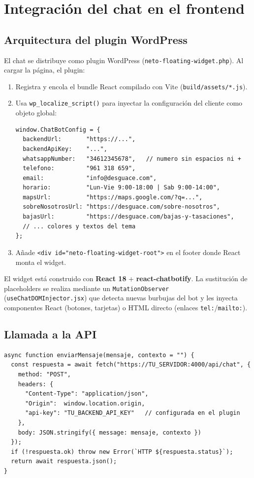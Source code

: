 \documentclass[12pt, a4paper]{article}
\begin{document}
\section{Integración del chat en el frontend}

\subsection{Arquitectura del plugin WordPress}

El chat se distribuye como plugin WordPress (\texttt{neto-floating-widget.php}).
Al cargar la página, el plugin:

\begin{enumerate}[noitemsep]
  \item Registra y encola el bundle React compilado con Vite (\texttt{build/assets/*.js}).
  \item Usa \texttt{wp\_localize\_script()} para inyectar la configuración del cliente como objeto global:
\begin{lstlisting}[style=js]
window.ChatBotConfig = {
  backendUrl:       "https://...",
  backendApiKey:    "...",
  whatsappNumber:   "34612345678",   // numero sin espacios ni +
  telefono:         "961 318 659",
  email:            "info@desguace.com",
  horario:          "Lun-Vie 9:00-18:00 | Sab 9:00-14:00",
  mapsUrl:          "https://maps.google.com/?q=...",
  sobreNosotrosUrl: "https://desguace.com/sobre-nosotros",
  bajasUrl:         "https://desguace.com/bajas-y-tasaciones",
  // ... colores y textos del tema
};
\end{lstlisting}
  \item Añade \texttt{<div id="neto-floating-widget-root">} en el footer donde React monta el widget.
\end{enumerate}

El widget está construido con \textbf{React 18} + \textbf{react-chatbotify}. La sustitución de placeholders se realiza mediante un \texttt{MutationObserver} (\texttt{useChatDOMInjector.jsx}) que detecta nuevas burbujas del bot y les inyecta componentes React (botones, tarjetas) o HTML directo (enlaces \texttt{tel:}/\texttt{mailto:}).

\subsection{Llamada a la API}

\begin{lstlisting}[style=js, caption={Función básica de llamada al backend}]
async function enviarMensaje(mensaje, contexto = "") {
  const respuesta = await fetch("https://TU_SERVIDOR:4000/api/chat", {
    method: "POST",
    headers: {
      "Content-Type": "application/json",
      "Origin":  window.location.origin,
      "api-key": "TU_BACKEND_API_KEY"   // configurada en el plugin
    },
    body: JSON.stringify({ message: mensaje, contexto })
  });
  if (!respuesta.ok) throw new Error(`HTTP ${respuesta.status}`);
  return await respuesta.json();
}
\end{lstlisting}
\end{document}
